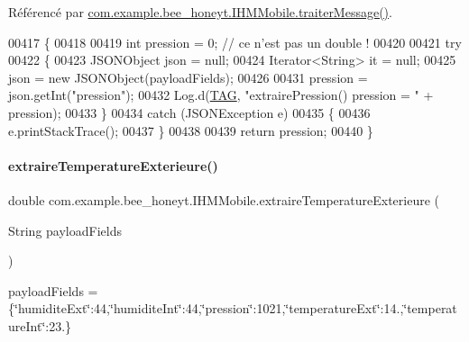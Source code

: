 Référencé par \hyperlink{_i_h_m_mobile_8java_source_l00374}{com.\+example.\+bee\+\_\+honeyt.\+I\+H\+M\+Mobile.\+traiter\+Message()}.


\begin{DoxyCode}
00417     \{
00418 
00419         \textcolor{keywordtype}{int} pression = 0; \textcolor{comment}{// ce n'est pas un double !}
00420 
00421         \textcolor{keywordflow}{try}
00422         \{
00423             JSONObject json = null;
00424             Iterator<String> it = null;
00425             json = \textcolor{keyword}{new} JSONObject(payloadFields);
00426 
00431             pression = json.getInt(\textcolor{stringliteral}{"pression"});
00432             Log.d(\hyperlink{classcom_1_1example_1_1bee__honeyt_1_1_i_h_m_mobile_a366987bf9bb2ed1010b2f967d4efa263}{TAG}, \textcolor{stringliteral}{"extrairePression() pression = "} + pression);
00433         \}
00434         \textcolor{keywordflow}{catch} (JSONException e)
00435         \{
00436             e.printStackTrace();
00437         \}
00438 
00439         \textcolor{keywordflow}{return} pression;
00440     \}
\end{DoxyCode}
\mbox{\label{classcom_1_1example_1_1bee__honeyt_1_1_i_h_m_mobile_a80b9ad15fb6aa3591cf600892b1325b9}} 
\paragraph{\texorpdfstring{extraire\+Temperature\+Exterieure()}{extraireTemperatureExterieure()}}
{\footnotesize\ttfamily double com.\+example.\+bee\+\_\+honeyt.\+I\+H\+M\+Mobile.\+extraire\+Temperature\+Exterieure (\begin{DoxyParamCaption}\item[{String}]{payload\+Fields }\end{DoxyParamCaption})\hspace{0.3cm}{\ttfamily [private]}}

payload\+Fields = \{\char`\"{}humidite\+Ext\char`\"{}\+:44,\char`\"{}humidite\+Int\char`\"{}\+:44,\char`\"{}pression\char`\"{}\+:1021,\char`\"{}temperature\+Ext\char`\"{}\+:14.,\char`\"{}temperature\+Int\char`\"{}\+:23.\}

